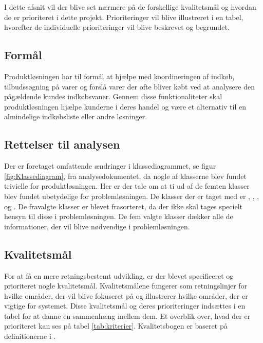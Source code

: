 I dette afsnit vil der blive set nærmere på de forskellige kvalitetsmål og hvordan de er prioriteret i dette projekt.
Prioriteringer vil blive illustreret i en tabel, hvorefter de individuelle prioriteringer vil blive beskrevet og begrundet.

\subsection{Formål}
Produktløsningen har til formål at hjælpe med koordineringen af indkøb, tilbudssøgning på varer og forslå varer der ofte bliver købt ved at analysere den pågældende kundes indkøbsvaner.
Gennem disse funktionaliteter skal produktløsningen hjælpe kunderne i deres handel og være et alternativ til en almindelige indkøbsliste eller andre løsninger.

\subsection{Rettelser til analysen}
\label{sec:rettelsertilanalyse}
Der er foretaget omfattende ændringer i klassediagrammet, se figur \ref{fig:Klassediagram}, fra analysedokumentet, da nogle af klasserne blev fundet trivielle for produktløsningen. Her er der tale om at ti ud af de femten klasser blev fundet ubetydelige for problemløsningen. De klasser der er taget med er , , ,  og . De fravalgte klasser er blevet frasorteret, da der ikke skal tages specielt hensyn til disse i problemløsningen. De fem valgte klasser dækker alle de informationer, der vil blive nødvendige i problemløsningen.

\subsection{Kvalitetsmål}
\label{sec:kvalitetsmaal}
For at få en mere retningsbestemt udvikling, er der blevet specificeret og prioriteret nogle kvalitetsmål. Kvalitetsmålene fungerer som retningslinjer for hvilke områder, der vil blive fokuseret på og illustrerer hvilke områder, der er vigtige for systemet. Disse kvalitetsmål og deres prioriteringer indsættes i en tabel for at danne en sammenhæng mellem dem. Et overblik over, hvad der er prioriteret kan ses på tabel \ref{tab:kriterier}. Kvalitetsbogen er baseret på definitionerne i \citep{ooaogd}.

